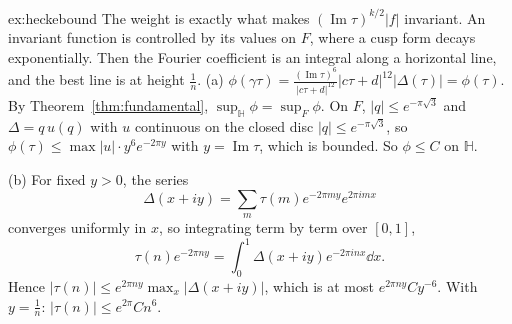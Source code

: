 \begin{solution}{ex:heckebound}
\idea The weight is exactly what makes $(\operatorname{Im}\tau)^{k/2}|f|$ invariant. An invariant function is controlled by its values on $F$, where a cusp form decays exponentially. Then the Fourier coefficient is an
integral along a horizontal line, and the best line is at height $\frac1n$.
\writeup (a) $\phi(\gamma\tau)=\frac{(\operatorname{Im}\tau)^6}{|c\tau+d|^{12}}|c\tau+d|^{12}|\Delta(\tau)|=\phi(\tau)$. By Theorem~\ref{thm:fundamental}, $\sup_{\mathbb H}\phi=\sup_F\phi$. On $F$, $|q|\le e^{-\pi\sqrt3}$ and $\Delta=q\,u(q)$ with
$u$ continuous on the closed disc $|q|\le e^{-\pi\sqrt3}$, so $\phi(\tau)\le\max|u|\cdot y^6e^{-2\pi y}$ with $y=\operatorname{Im}\tau$, which is bounded. So $\phi\le C$ on $\mathbb H$.

(b) For fixed $y>0$, the series
\[
\Delta(x+iy)=\sum_m\tau(m)e^{-2\pi my}e^{2\pi imx}
\]
converges uniformly in $x$, so integrating term by term over $[0,1]$,
\[
\tau(n)e^{-2\pi ny}=\int_0^1\Delta(x+iy)e^{-2\pi inx}\dd x.
\]
Hence $|\tau(n)|\le e^{2\pi ny}\max_x|\Delta(x+iy)|$, which is at most $e^{2\pi ny}Cy^{-6}$. With $y=\frac1n$: $|\tau(n)|\le e^{2\pi}Cn^6$.
\end{solution}

